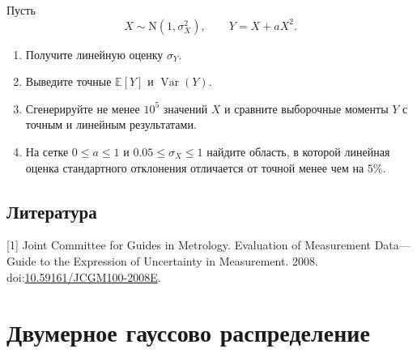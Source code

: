 \documentclass[
  russian,
  11pt,
  a4paper,
  open=any]{scrbook}
\newlength{\cslhangindent}
\newenvironment{CSLReferences}[2] %
 {\begin{list}{}{%
  \setlength{\itemindent}{0pt}
  \setlength{\leftmargin}{0pt}
  \setlength{\parsep}{0pt}
  \ifodd #1
   \setlength{\leftmargin}{\cslhangindent}
   \setlength{\itemindent}{-1\cslhangindent}
  \fi
  \setlength{\itemsep}{#2\baselineskip}}}
 {\end{list}}
\providecommand{\tightlist}{%
  \setlength{\itemsep}{0pt}\setlength{\parskip}{0pt}}
\begin{document}
\begin{semanticpdfbox}[colback=BookCoralSoft,borderline west={1.2mm}{0pt}{BookCoral}]

\par\nopagebreak[4]\vspace{1.2mm}

Пусть \[
X\sim\mathrm N(1,\sigma_X^2),
\qquad
Y=X+aX^2.
\]

\begin{enumerate}
\def\labelenumi{\arabic{enumi}.}
\tightlist
\item
  Получите линейную оценку \(\sigma_Y\).
\item
  Выведите точные \(\mathbb E[Y]\) и \(\operatorname{Var}(Y)\).
\item
  Сгенерируйте не менее \(10^5\) значений \(X\) и сравните выборочные
  моменты \(Y\) с точным и линейным результатами.
\item
  На сетке \(0\le a\le1\) и \(0.05\le\sigma_X\le1\) найдите область, в
  которой линейная оценка стандартного отклонения отличается от точной
  менее чем на \(5\%\).
\end{enumerate}

\end{semanticpdfbox}

\section*{Литература}\label{ux43bux438ux442ux435ux440ux430ux442ux443ux440ux430-5}


\protect{}\label{refs}
\begin{CSLReferences}{0}{0}
{[}1{]} Joint Committee for Guides in Metrology. Evaluation of
Measurement Data---Guide to the Expression of Uncertainty in
Measurement. 2008.
doi:\href{https://doi.org/10.59161/JCGM100-2008E}{10.59161/JCGM100-2008E}.

\end{CSLReferences}

\chapter{Двумерное гауссово
распределение}\label{ux434ux432ux443ux43cux435ux440ux43dux43eux435-ux433ux430ux443ux441ux441ux43eux432ux43e-ux440ux430ux441ux43fux440ux435ux434ux435ux43bux435ux43dux438ux435}
\end{document}
